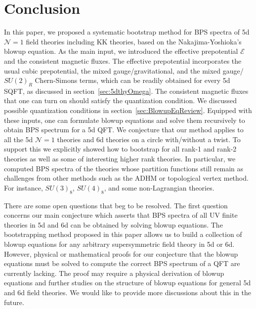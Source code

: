 \section{Conclusion}\label{sec:Conclusion}

In this paper, we proposed a systematic bootstrap method for BPS spectra of 5d $\mathcal{N} = 1$ field theories including KK theories, based on the Nakajima-Yoshioka's blowup equation. As the main input, we introduced the effective prepotential $\mathcal{E}$ and the consistent magnetic fluxes. The effective prepotential incorporates the usual cubic prepotential, the mixed gauge/gravitational, and the mixed gauge/$SU(2)_R$ Chern-Simons terms, which can be readily obtained for every 5d SQFT, as discussed in section~\ref{sec:5dthyOmega}. The consistent magnetic fluxes that one can turn on should satisfy the quantization condition. We discussed possible quantization conditions in section~\ref{sec:BlowupEqReview}. Equipped with these inputs, one can formulate blowup equations and solve them recursively to obtain BPS spectrum for a 5d QFT. We conjecture that our method applies to all the 5d $\mathcal{N}=1$ theories and 6d theories on a circle with/without a twist. To support this we explicitly showed how to bootstrap for all rank-1 and rank-2 theories as well as some of interesting higher rank theories. In particular, we computed BPS spectra of the theories whose partition functions still remain as challenges from other methods such as the ADHM or topological vertex method. For instance, $SU(3)_8$, $SU(4)_8$, and some non-Lagrangian theories.

There are some open questions that beg to be resolved. The first question concerns our main conjecture which asserts that BPS spectra of all UV finite theories in 5d and 6d can be obtained by solving blowup equations. The bootstrapping method proposed in this paper allows us to build a collection of blowup equations for any arbitrary supersymmetric field theory in 5d or 6d. However, physical or mathematical proofs for our conjecture that the blowup equations must be solved to compute the correct BPS spectrum of a QFT are currently lacking. The proof may require a physical derivation of blowup equations and further studies on the structure of blowup equations for general 5d and 6d field theories. We would like to provide more discussions about this in the future.

